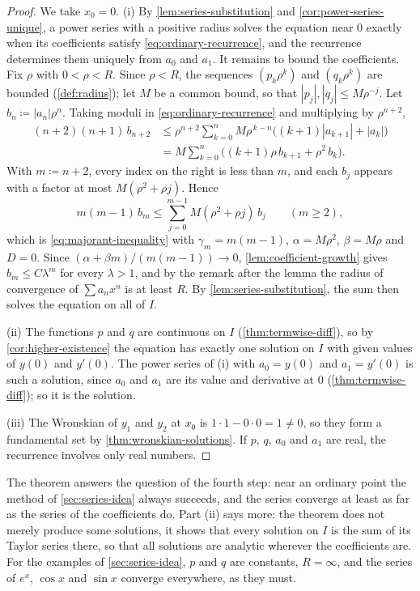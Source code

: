\begin{proof}
We take $x_0=0$. (i) By \cref{lem:series-substitution} and \cref{cor:power-series-unique}, a power series with a positive radius solves the equation near $0$ exactly when its coefficients satisfy \eqref{eq:ordinary-recurrence}, and the recurrence determines them uniquely from $a_0$ and $a_1$. It remains to bound the coefficients. Fix $\rho$ with $0<\rho<R$. Since $\rho<R$, the sequences $(p_k\rho^k)$ and $(q_k\rho^k)$ are bounded (\cref{def:radius}); let $M$ be a common bound, so that $|p_j|,|q_j|\le M\rho^{-j}$. Let $b_n\coloneqq|a_n|\rho^n$. Taking moduli in \eqref{eq:ordinary-recurrence} and multiplying by $\rho^{n+2}$,
\begin{align*}
(n+2)(n+1)\,b_{n+2}&\le\rho^{n+2}\sum_{k=0}^nM\rho^{\,k-n}\bigl((k+1)|a_{k+1}|+|a_k|\bigr)\\
&=M\sum_{k=0}^n\bigl((k+1)\rho\,b_{k+1}+\rho^2\,b_k\bigr).
\end{align*}
With $m\coloneqq n+2$, every index on the right is less than $m$, and each $b_j$ appears with a factor at most $M(\rho^2+\rho j)$. Hence
\[
m(m-1)\,b_m\le\sum_{j=0}^{m-1}M(\rho^2+\rho j)\,b_j\qquad(m\ge2),
\]
which is \eqref{eq:majorant-inequality} with $\gamma_m=m(m-1)$, $\alpha=M\rho^2$, $\beta=M\rho$ and $D=0$. Since $(\alpha+\beta m)/(m(m-1))\to0$, \cref{lem:coefficient-growth} gives $b_m\le C\lambda^m$ for every $\lambda>1$, and by the remark after the lemma the radius of convergence of $\sum a_nx^n$ is at least $R$. By \cref{lem:series-substitution}, the sum then solves the equation on all of $I$.

(ii) The functions $p$ and $q$ are continuous on $I$ (\cref{thm:termwise-diff}), so by \cref{cor:higher-existence} the equation has exactly one solution on $I$ with given values of $y(0)$ and $y'(0)$. The power series of (i) with $a_0=y(0)$ and $a_1=y'(0)$ is such a solution, since $a_0$ and $a_1$ are its value and derivative at $0$ (\cref{thm:termwise-diff}); so it is the solution.

(iii) The Wronskian of $y_1$ and $y_2$ at $x_0$ is $1\cdot1-0\cdot0=1\ne0$, so they form a fundamental set by \cref{thm:wronskian-solutions}. If $p$, $q$, $a_0$ and $a_1$ are real, the recurrence involves only real numbers.
\end{proof}

The theorem answers the question of the fourth step: near an ordinary point the method of \cref{sec:series-idea} always succeeds, and the series converge at least as far as the series of the coefficients do. Part (ii) says more: the theorem does not merely produce some solutions, it shows that every solution on $I$ is the sum of its Taylor series there, so that all solutions are analytic wherever the coefficients are. For the examples of \cref{sec:series-idea}, $p$ and $q$ are constants, $R=\infty$, and the series of $e^x$, $\cos x$ and $\sin x$ converge everywhere, as they must.

